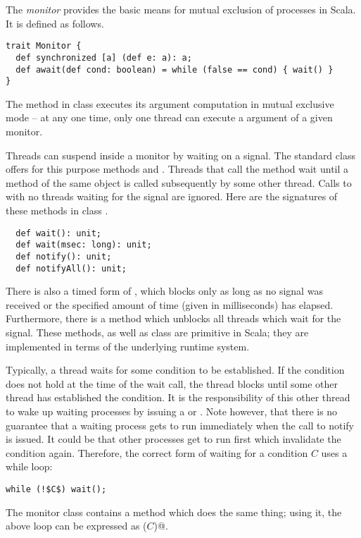 {\example
The {\em monitor} provides the basic means for mutual exclusion
of processes in Scala. It is defined as follows.
\begin{lstlisting}
trait Monitor {
  def synchronized [a] (def e: a): a;
  def await(def cond: boolean) = while (false == cond) { wait() }
}
\end{lstlisting}
The  method in class  executes its
argument computation  in mutual exclusive mode -- at any one
time, only one thread can execute a  argument of a
given monitor.

Threads can suspend inside a monitor by waiting on a signal.  The
standard  class offers for this purpose methods
 and .  Threads that call the 
method wait until a  method of the same object is called
subsequently by some other thread. Calls to  with no
threads waiting for the signal are ignored. 
Here are the signatures of these methods in class
.
\begin{lstlisting}
  def wait(): unit;
  def wait(msec: long): unit;
  def notify(): unit;
  def notifyAll(): unit;
\end{lstlisting}
There is also a timed form of , which blocks only as long
as no signal was received or the specified amount of time (given in
milliseconds) has elapsed. Furthermore, there is a 
method which unblocks all threads which wait for the signal. 
These methods, as well as class  are primitive in
Scala; they are implemented in terms of the underlying runtime system.

Typically, a thread waits for some condition to be established. If the
condition does not hold at the time of the wait call, the thread
blocks until some other thread has established the condition. It is
the responsibility of this other thread to wake up waiting processes
by issuing a  or . Note however, that
there is no guarantee that a waiting process gets to run immediately
when the call to notify is issued. It could be that other processes
get to run first which invalidate the condition again. Therefore, the
correct form of waiting for a condition $C$ uses a while loop:
\begin{lstlisting}
while (!$C$) wait();
\end{lstlisting}
The monitor class contains a method  which does the same 
thing; using it, the above loop can be expressed as \lstinline@await($C$)@.

}
